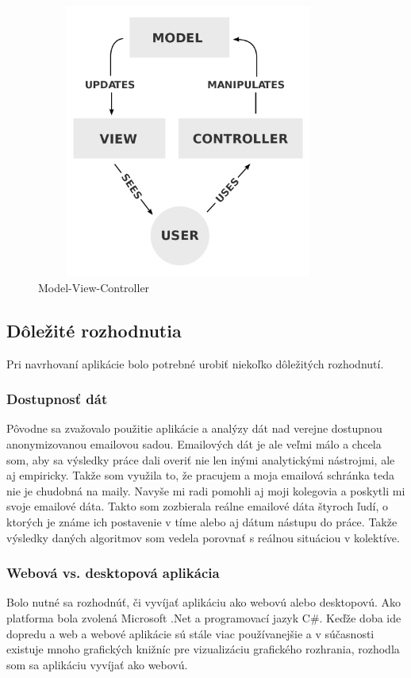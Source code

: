 \documentclass[slovak,master,public,dept460,male,cpdeclaration,oneside]{diploma}
\begin{document}
\begin{figure}[H]
\centering
\includegraphics[width=10cm, height=9cm]{figures/MVC}
\caption{Model-View-Controller}
\end{figure}


\subsection{Dôležité rozhodnutia}
Pri navrhovaní aplikácie bolo potrebné urobiť niekoľko dôležitých rozhodnutí.

\subsubsection{Dostupnosť dát}
Pôvodne sa zvažovalo použitie aplikácie a analýzy dát nad verejne dostupnou anonymizovanou emailovou sadou. Emailových dát je ale veľmi málo a chcela som, aby sa výsledky práce dali overiť nie len inými analytickými nástrojmi, ale aj empiricky. Takže som využila to, že pracujem a moja emailová schránka teda nie je chudobná na maily. Navyše mi radi pomohli aj moji kolegovia a poskytli mi svoje emailové dáta. Takto som zozbierala reálne emailové dáta štyroch ľudí, o ktorých je známe ich postavenie v tíme alebo aj dátum nástupu do práce. Takže výsledky daných algoritmov som vedela porovnať s reálnou situáciou v kolektíve.

\subsubsection{Webová vs. desktopová aplikácia}
Bolo nutné sa rozhodnúť, či vyvíjať aplikáciu ako webovú alebo desktopovú. Ako platforma bola zvolená Microsoft .Net a programovací jazyk C\#. Keďže doba ide dopredu a web a webové aplikácie sú stále viac používanejšie a v súčasnosti existuje mnoho grafických knižníc pre vizualizáciu grafického rozhrania, rozhodla som sa aplikáciu vyvíjať ako webovú.
\end{document}
